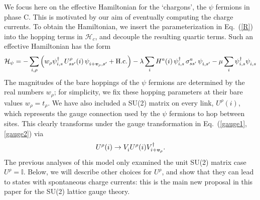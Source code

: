 \documentclass[aps,prb,preprint,onecolumn,citeautoscript,superscriptaddress,footinbib,
eqsecnum]{revtex4-1}
\newcommand{\beq}{\begin{equation}}
\newcommand{\eeq}{\end{equation}}
\begin{document}
We focus here on the  
effective Hamiltonian for the `chargons', the $\psi$ fermions in phase C. This is motivated by our aim of eventually
computing the charge currents. To obtain the Hamiltonian, we insert the parameterization in Eq.~(\ref{R}) into the hopping terms in 
$\mathcal{H}_c$, and decouple the resulting quartic terms.   Such an effective Hamiltonian has the form
\beq
\mathcal{H}_\psi =  - \sum_{i,\rho}\left( w_\rho  \psi_{i ,s}^\dagger \, U_{ss'}^\rho (i) \, \psi_{i + {\bm v}_\rho, s'}^{\vphantom \dagger}  + \mbox{H.c.} \right)
-\lambda \sum_i H^a (i) \, \psi_{i ,s}^\dagger \, \sigma^a_{ss'} \, \psi_{i  ,s'}^{\vphantom \dagger} - \mu
\sum_i  \psi_{i ,s}^\dagger  \psi_{i  ,s}^{\vphantom \dagger} \label{Hpsi}
\eeq
The magnitudes of the bare hoppings of the $\psi$ fermions are determined by the real numbers $w_\rho$; for simplicity, we fix
these hopping parameters at their bare values $w_\rho = t_\rho$. We have also included a SU(2) matrix on every link, $U^\rho (i)$, 
which represents the gauge connection used by the $\psi$ fermions to hop between sites. This clearly transforms under the gauge
transformation in Eq.~(\ref{gauge1},\ref{gauge2}) via
\beq
U^\rho (i) \rightarrow V_{i}^{\vphantom \dagger} U^\rho (i) V_{i + {\bm v}_\rho}^\dagger . \label{Ugauge}
\eeq
The previous analyses of this model \cite{SS09,DCSS15b,DCSS16,2016PhRvB..94k5147S} only examined the unit SU(2) matrix case $U^\rho = \mathbb{I}$. Below, we will describe other choices for $U^\rho$, and show that they can lead to states with spontaneous charge currents: 
this is the main new proposal in this paper for the SU(2) lattice gauge theory.
\end{document}
